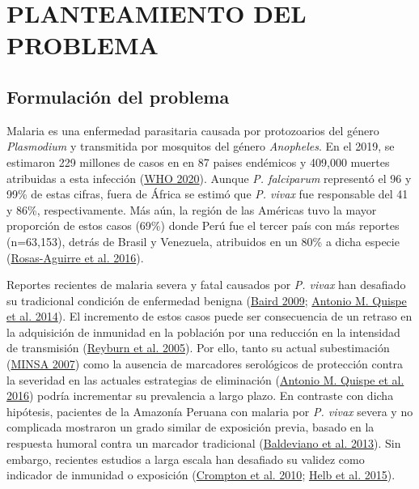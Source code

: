 \documentclass[
  a4paper]{article}
\begin{document}
\hypertarget{planteamiento-del-problema}{%
\section{PLANTEAMIENTO DEL PROBLEMA}\label{planteamiento-del-problema}}

\hypertarget{intro}{%
\subsection{Formulación del problema}\label{intro}}

Malaria es una enfermedad parasitaria causada por protozoarios del
género \emph{Plasmodium} y transmitida por mosquitos del género
\emph{Anopheles}. En el 2019, se estimaron 229 millones de casos en en
87 paises endémicos y 409,000 muertes atribuidas a esta infección
(\protect\hyperlink{ref-world2020world}{WHO 2020}). Aunque \emph{P.
falciparum} representó el 96 y 99\% de estas cifras, fuera de África se
estimó que \emph{P. vivax} fue responsable del 41 y 86\%,
respectivamente. Más aún, la región de las Américas tuvo la mayor
proporción de estos casos (69\%) donde Perú fue el tercer país con más
reportes (n=63,153), detrás de Brasil y Venezuela, atribuidos en un 80\%
a dicha especie (\protect\hyperlink{ref-rosas2016peru}{Rosas-Aguirre et
al. 2016}).

Reportes recientes de malaria severa y fatal causados por \emph{P.
vivax} han desafiado su tradicional condición de enfermedad benigna
(\protect\hyperlink{ref-baird2009}{Baird 2009};
\protect\hyperlink{ref-quispe2014}{Antonio M. Quispe et al. 2014}). El
incremento de estos casos puede ser consecuencia de un retraso en la
adquisición de inmunidad en la población por una reducción en la
intensidad de transmisión (\protect\hyperlink{ref-reyburn2015}{Reyburn
et al. 2005}). Por ello, tanto su actual subestimación
(\protect\hyperlink{ref-norma2001}{MINSA 2007}) como la ausencia de
marcadores serológicos de protección contra la severidad en las actuales
estrategias de eliminación
(\protect\hyperlink{ref-accelerate2016}{Antonio M. Quispe et al. 2016})
podría incrementar su prevalencia a largo plazo. En contraste con dicha
hipótesis, pacientes de la Amazonía Peruana con malaria por \emph{P.
vivax} severa y no complicada mostraron un grado similar de exposición
previa, basado en la respuesta humoral contra un marcador tradicional
(\protect\hyperlink{ref-baldevi2013}{Baldeviano et al. 2013}). Sin
embargo, recientes estudios a larga escala han desafiado su validez como
indicador de inmunidad o exposición
(\protect\hyperlink{ref-crompton2010}{Crompton et al. 2010};
\protect\hyperlink{ref-Helb2015exposure}{Helb et al. 2015}).
\end{document}
